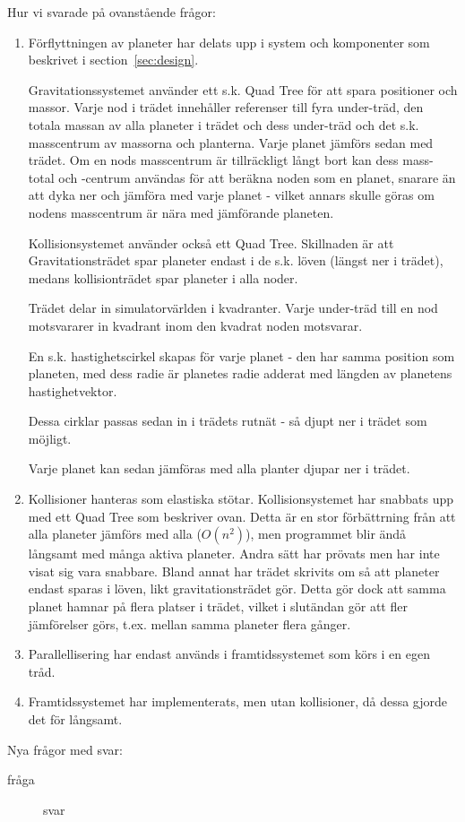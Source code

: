 
Hur vi svarade på ovanstående frågor:
\begin{enumerate}
    \item Förflyttningen av planeter har delats upp i system och komponenter
        som beskrivet i section~\ref{sec:design}.

        \vspace{6pt}

        Gravitationssystemet använder ett s.k. Quad Tree för att
        spara positioner och massor.
        Varje nod i trädet innehåller referenser till fyra under-träd, 
        den totala massan av alla planeter i trädet och dess under-träd
        och det s.k. masscentrum av massorna och planterna.
        Varje planet jämförs sedan med trädet.
        Om en nods masscentrum är tillräckligt långt bort kan
        dess mass-total och -centrum
        användas för att beräkna noden som en planet, snarare än att
        dyka ner och jämföra med varje planet - vilket annars skulle göras
        om nodens masscentrum är nära med jämförande planeten.

        \vspace{6pt}

        Kollisionsystemet använder också ett Quad Tree.
        Skillnaden är att Gravitationsträdet spar planeter endast i
        de s.k. löven (längst ner i trädet), medans kollisionträdet
        spar planeter i alla noder.

        Trädet delar in simulatorvärlden i kvadranter.
        Varje under-träd till en nod motsvararer in kvadrant inom
        den kvadrat noden motsvarar.

        En s.k. hastighetscirkel skapas för varje planet - 
        den har samma position som planeten, med dess radie
        är planetes radie adderat med längden av planetens hastighetvektor.

        Dessa cirklar passas sedan in i trädets rutnät - så djupt ner i
        trädet som möjligt.

        Varje planet kan sedan jämföras med alla planter djupar ner i trädet.

    \item Kollisioner hanteras som elastiska stötar.
        Kollisionsystemet har snabbats upp med ett Quad Tree som beskriver
        ovan. Detta är en stor förbättrning från att alla planeter
        jämförs med alla ($O(n^2)$), men programmet blir ändå långsamt med
        många aktiva planeter.
        Andra sätt har prövats men har inte visat sig vara snabbare.
        Bland annat har trädet skrivits om så att planeter endast sparas
        i löven, likt gravitationsträdet gör. Detta gör
        dock att samma planet hamnar på flera platser i trädet, vilket
        i slutändan gör att fler jämförelser görs, t.ex. mellan samma
        planeter flera gånger.
    \item Parallellisering har endast används i framtidssystemet som körs i en egen tråd.
    \item Framtidssystemet har implementerats, men utan kollisioner,
        då dessa gjorde det för långsamt.
\end{enumerate}

Nya frågor med svar:

\begin{description}
    \item[fråga] svar %
\end{description}
